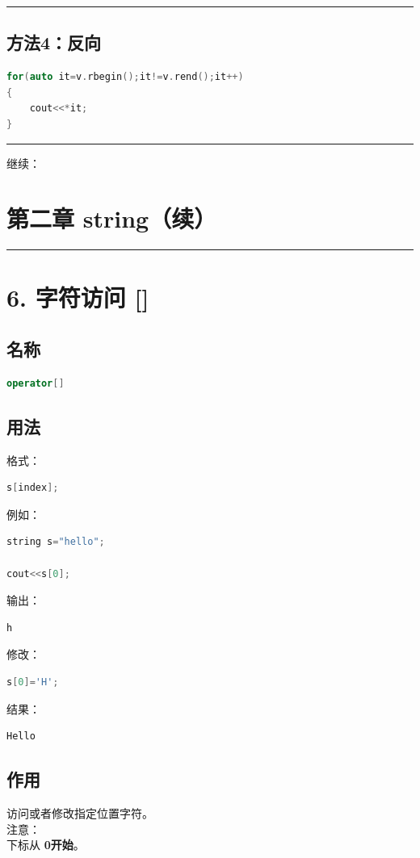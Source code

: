 \documentclass[9pt,twocolumn]{extarticle}
\begin{document}
\noindent\rule{\linewidth}{0.4pt}

\subsection{方法4：反向}
\begin{lstlisting}[language=C++]
for(auto it=v.rbegin();it!=v.rend();it++)
{
    cout<<*it;
}
\end{lstlisting}

\noindent\rule{\linewidth}{0.4pt}
继续：

\section{第二章 string（续）}

\noindent\rule{\linewidth}{0.4pt}

\section{6. 字符访问 []}

\subsection{名称}
\begin{lstlisting}[language=C++]
operator[]
\end{lstlisting}

\subsection{用法}
格式：
\begin{lstlisting}[language=C++]
s[index];
\end{lstlisting}
例如：
\begin{lstlisting}[language=C++]
string s="hello";

cout<<s[0];
\end{lstlisting}
输出：
\begin{lstlisting}
h
\end{lstlisting}
修改：
\begin{lstlisting}[language=C++]
s[0]='H';
\end{lstlisting}
结果：
\begin{lstlisting}
Hello
\end{lstlisting}

\subsection{作用}
访问或者修改指定位置字符。\\
注意：\\
下标从 \textbf{0开始}。
\end{document}
